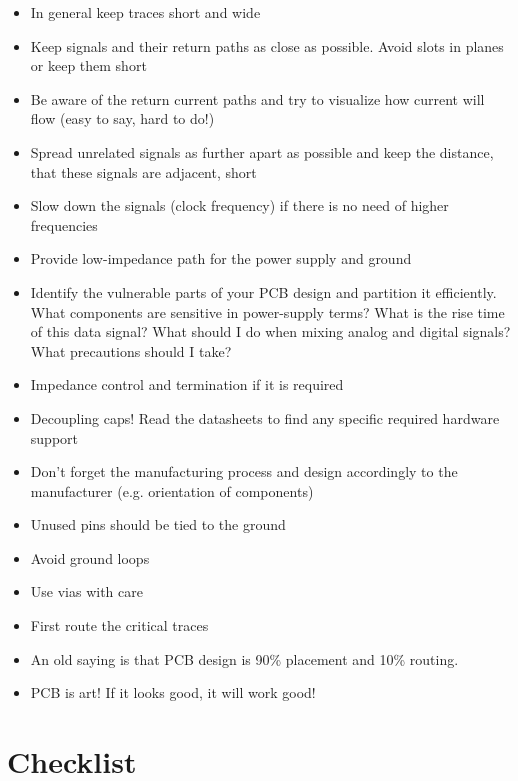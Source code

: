 \documentclass[final]{cubedoc}
\begin{document}
	\begin{itemize}
		\item In general keep traces short and wide
		\item Keep signals and their return paths as close as possible. Avoid slots in planes or keep them short
		\item Be aware of the return current paths and try to visualize how current will flow (easy to say, hard to do!)
		\item Spread unrelated signals as further apart as possible and keep the distance, that these signals are adjacent, short
		\item Slow down the signals (clock frequency) if there is no need of higher frequencies
		\item Provide low-impedance path for the power supply and ground
		\item Identify the vulnerable parts of your PCB design and partition it efficiently. What components are sensitive in power-supply terms? What is the rise time of this data signal? What should I do when mixing analog and digital signals? What precautions should I take?
		\item Impedance control and termination if it is required
		\item Decoupling caps!
		\items Read the datasheets to find any specific required hardware support
		\item Don't forget the manufacturing process and design accordingly to the manufacturer (e.g. orientation of components)
		\item Unused pins should be tied to the ground
		\item Avoid ground loops
		\item Use vias with care
		\item First route the critical traces
		\item An old saying is that PCB design is 90\% placement and 10\% routing.
		\item PCB is art! If it looks good, it will work good!
	\end{itemize}
	
	\section{Checklist}
	
\end{document}
